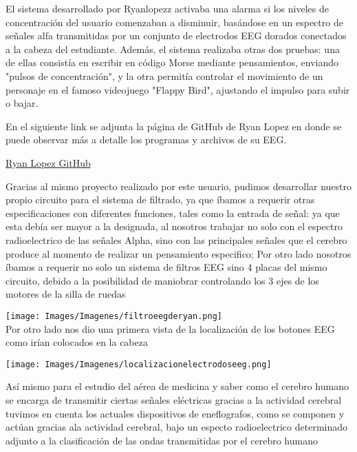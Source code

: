 \documentclass{article}
\begin{document}
El sistema desarrollado por Ryanlopezz activaba una alarma si los niveles de concentración del usuario comenzaban a disminuir, basándose en un espectro de señales alfa transmitidas por un conjunto de electrodos EEG dorados conectados a la cabeza del estudiante. Además, el sistema realizaba otras dos pruebas: una de ellas consistía en escribir en código Morse mediante pensamientos, enviando "pulsos de concentración", y la otra permitía controlar el movimiento de un personaje en el famoso videojuego "Flappy Bird", ajustando el impulso para subir o bajar.

En el siguiente link se adjunta la página de GitHub de Ryan Lopez en donde se puede observar más a detalle los programas y archivos de su EEG.


\begin{center}
    \href{https://github.com/ryanlopezzzz/EEG}{Ryan Lopez GitHub}
\end{center}


Gracias al mismo proyecto realizado por este usuario, pudimos desarrollar nuestro propio circuito para el sistema de filtrado, ya que íbamos a requerir otras especificaciones con diferentes funciones, tales como la entrada de señal: ya que esta debía ser mayor a la designada, al nosotros trabajar no solo con el espectro radioelectrico de las señales Alpha, sino con las principales señales que el cerebro produce al momento de realizar un pensamiento especifico; Por otro lado nosotros íbamos a requerir no solo un sistema de filtros EEG sino 4 placas del mismo circuito, debido a la posibilidad de maniobrar controlando los 3 ejes de los motores de la silla de ruedas


\begin{center}
    \texttt{[image: Images/Imagenes/filtroeegderyan.png]}\\
    
Por otro lado nos dio una primera vista de la localización de los botones EEG como irían colocados en la cabeza

\end{center}

\begin{center}
    \texttt{[image: Images/Imagenes/localizacionelectrodoseeg.png]}\\

\end{center}

Así mismo para el estudio del aérea de medicina y saber como el cerebro humano se encarga de transmitir ciertas señales eléctricas gracias a la actividad cerebral  tuvimos en cuenta los actuales dispositivos de eneflografos, como se componen y actúan gracias ala actividad cerebral, bajo un especto radioelectrico determinado adjunto a la clasificación de las ondas transmitidas por el cerebro humano
\end{document}
